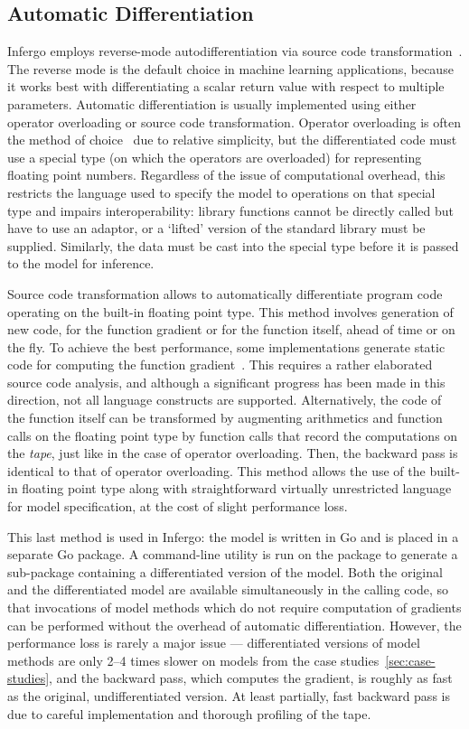 \documentclass[sigplan,review,10pt,anonymous]{acmart}
\begin{document}
\begin{sloppypar}
\subsection{Automatic Differentiation}

Infergo employs reverse-mode autodifferentiation via source code
transformation~\cite{GW08}. The reverse mode is the default
choice in machine learning applications, because it works best
with differentiating a scalar return value with respect to
multiple parameters. Automatic differentiation is usually
implemented using either operator overloading or source code
transformation. Operator overloading is often the method of
choice~\cite{Stan17,GXG18,PGC+17} due to relative simplicity,
but the differentiated code must use a special type (on which
the operators are overloaded) for representing floating point
numbers. Regardless of the issue of computational overhead, this
restricts the language used to specify the model to operations on
that special type and impairs interoperability: library
functions cannot be directly called but have to use an adaptor,
or a `lifted' version of the standard library must be supplied.
Similarly, the data must be cast into the special type before it
is passed to the model for inference.

Source code transformation allows to automatically differentiate
program code operating on the built-in floating point type. This
method involves generation of new code, for the function
gradient or for the function itself, ahead of time or on the
fly. To achieve the best performance, some implementations
generate static code for computing the function
gradient~\cite{MMW18,I18}. This requires a rather elaborated
source code analysis, and although a significant progress has
been made in this direction, not all language constructs are
supported. Alternatively, the code of the function itself can be
transformed by augmenting arithmetics and function calls on the
floating point type by function calls that record the
computations on the \textit{tape}, just like in the case of
operator overloading. Then, the backward pass is identical to
that of operator overloading. This method allows the
use of the built-in floating point type along with
straightforward virtually unrestricted language for model
specification, at the cost of slight performance loss.

This last method is used in Infergo: the model is written in Go
and is placed in a separate Go package. A command-line utility
is run on the package to generate a sub-package containing a
differentiated version of the model.  Both the original and the
differentiated model are available simultaneously in the calling
code, so that invocations of model methods which do not require
computation of gradients can be performed without the overhead
of automatic differentiation.  However, the performance loss is
rarely a major issue --- differentiated versions of model
methods are only 2--4 times slower on models from the case
studies~\ref{sec:case-studies}, and the backward pass, which
computes the gradient, is roughly as fast as the original,
undifferentiated version. At least partially, fast backward pass
is due to careful implementation and thorough profiling of
the tape.



\end{sloppypar}
\end{document}

